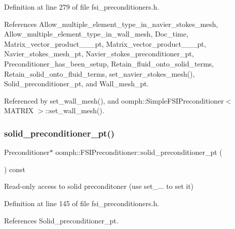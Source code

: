 Definition at line 279 of file fsi\+\_\+preconditioners.\+h.



References Allow\+\_\+multiple\+\_\+element\+\_\+type\+\_\+in\+\_\+navier\+\_\+stokes\+\_\+mesh, Allow\+\_\+multiple\+\_\+element\+\_\+type\+\_\+in\+\_\+wall\+\_\+mesh, Doc\+\_\+time, Matrix\+\_\+vector\+\_\+product\+\_\+\_\+\_\+pt, Matrix\+\_\+vector\+\_\+product\+\_\+\_\+\_\+pt, Navier\+\_\+stokes\+\_\+mesh\+\_\+pt, Navier\+\_\+stokes\+\_\+preconditioner\+\_\+pt, Preconditioner\+\_\+has\+\_\+been\+\_\+setup, Retain\+\_\+fluid\+\_\+onto\+\_\+solid\+\_\+terms, Retain\+\_\+solid\+\_\+onto\+\_\+fluid\+\_\+terms, set\+\_\+navier\+\_\+stokes\+\_\+mesh(), Solid\+\_\+preconditioner\+\_\+pt, and Wall\+\_\+mesh\+\_\+pt.



Referenced by set\+\_\+wall\+\_\+mesh(), and oomph\+::\+Simple\+F\+S\+I\+Preconditioner$<$ M\+A\+T\+R\+I\+X $>$\+::set\+\_\+wall\+\_\+mesh().

\mbox{\label{classoomph_1_1FSIPreconditioner_abc97d84c4d0e7a280947855b7f33c34c}} 
\subsubsection{\texorpdfstring{solid\+\_\+preconditioner\+\_\+pt()}{solid\_preconditioner\_pt()}}
{\footnotesize\ttfamily Preconditioner$\ast$ oomph\+::\+F\+S\+I\+Preconditioner\+::solid\+\_\+preconditioner\+\_\+pt (\begin{DoxyParamCaption}{ }\end{DoxyParamCaption}) const\hspace{0.3cm}{\ttfamily [inline]}}



Read-\/only access to solid preconditoner (use set\+\_\+... to set it) 



Definition at line 145 of file fsi\+\_\+preconditioners.\+h.



References Solid\+\_\+preconditioner\+\_\+pt.



